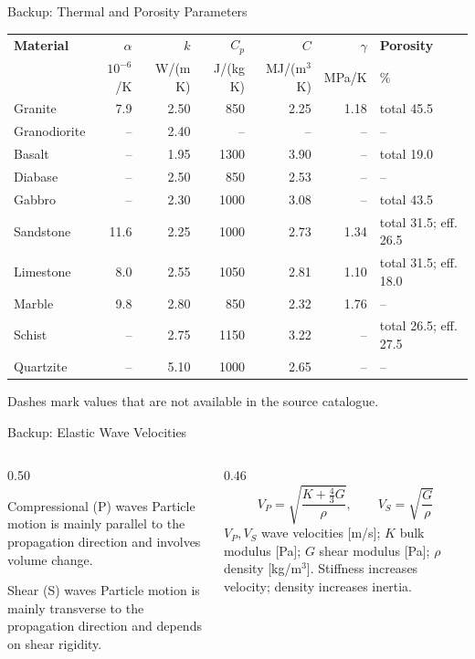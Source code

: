 \documentclass[aspectratio=169,10pt]{beamer}
\begin{document}
\begin{frame}{Backup: Thermal and Porosity Parameters}
  \scriptsize
  \renewcommand{\arraystretch}{1.12}
  \setlength{\tabcolsep}{3.2pt}
  \begin{tabular}{l|r|r|r|r|r|>{\raggedright\arraybackslash}p{}}
    \hline
    \textbf{Material} & $\alpha$ & $k$ & $C_p$ & $C$ & $\gamma$ & \textbf{Porosity} \\
    & $10^{-6}$/K & W/(m K) & J/(kg K) & MJ/(m$^3$ K) & MPa/K & \% \\
    \hline
    Granite      &  7.9 & 2.50 &  850 & 2.25 & 1.18 & total 45.5 \\
    Granodiorite & --   & 2.40 & --   & --   & --   & -- \\
    Basalt       & --   & 1.95 & 1300 & 3.90 & --   & total 19.0 \\
    Diabase      & --   & 2.50 &  850 & 2.53 & --   & -- \\
    Gabbro       & --   & 2.30 & 1000 & 3.08 & --   & total 43.5 \\
    Sandstone    & 11.6 & 2.25 & 1000 & 2.73 & 1.34 & total 31.5; eff. 26.5 \\
    Limestone    &  8.0 & 2.55 & 1050 & 2.81 & 1.10 & total 31.5; eff. 18.0 \\
    Marble       &  9.8 & 2.80 &  850 & 2.32 & 1.76 & -- \\
    Schist       & --   & 2.75 & 1150 & 3.22 & --   & total 26.5; eff. 27.5 \\
    Quartzite    & --   & 5.10 & 1000 & 2.65 & --   & -- \\
    \hline
  \end{tabular}
  \vskip 6pt
  Dashes mark values that are not available in the source catalogue.
\end{frame}

\begin{frame}{Backup: Elastic Wave Velocities}
  \begin{columns}[T]
    \begin{column}{0.50\textwidth}
      \begin{block}{Compressional (P) waves}
        Particle motion is mainly parallel to the propagation direction
        and involves volume change.
      \end{block}
      \begin{block}{Shear (S) waves}
        Particle motion is mainly transverse to the propagation direction
        and depends on shear rigidity.
      \end{block}
    \end{column}
    \begin{column}{0.46\textwidth}
      \[
        V_{P} = \sqrt{\frac{K+\tfrac{4}{3}G}{\rho}},
        \qquad
        V_{S} = \sqrt{\frac{G}{\rho}}
      \]
      \scriptsize
      $V_{P},V_{S}$ wave velocities [m/s]; $K$ bulk modulus [Pa];
      $G$ shear modulus [Pa]; $\rho$ density [kg/m$^3$]. Stiffness
      increases velocity; density increases inertia.
    \end{column}
  \end{columns}
\end{frame}
\end{document}

